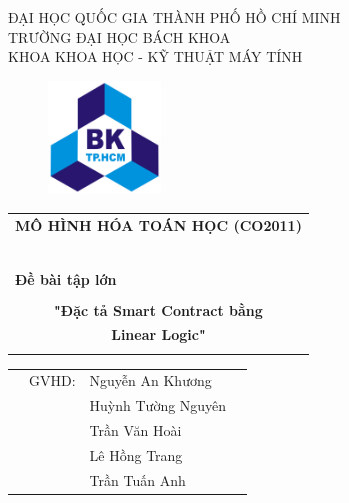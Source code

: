 \documentclass[a4paper]{article}
\begin{document}
\begin{titlepage}
\begin{center}
ĐẠI HỌC QUỐC GIA THÀNH PHỐ HỒ CHÍ MINH \\
TRƯỜNG ĐẠI HỌC BÁCH KHOA \\
KHOA KHOA HỌC - KỸ THUẬT MÁY TÍNH 
\end{center}

\vspace{1cm}

\begin{figure}[h!]
\begin{center}
\includegraphics[width=3cm]{Images/hcmut.png}
\end{center}
\end{figure}

\vspace{1cm}


\begin{center}
\begin{tabular}{c}
\multicolumn{1}{l}{\textbf{{\Large MÔ HÌNH HÓA TOÁN HỌC (CO2011)}}}\\
~~\\
\hline
\\
\multicolumn{1}{l}{\textbf{{\Large Đề bài tập lớn}}}\\
\\
\textbf{{\Huge "Đặc tả Smart Contract bằng}} \\
\textbf{{\Huge Linear Logic"}}\\
\\
\hline
\end{tabular}
\end{center}

\vspace{1.2cm}

\begin{table}[h]
\begin{tabular}{rrlr}
\hspace{5 cm} & GVHD: & Nguyễn An Khương &\\
\hspace{5 cm} &  & Huỳnh Tường Nguyên &\\
\hspace{5 cm} &  & Trần Văn Hoài &\\
\hspace{5 cm} &  & Lê Hồng Trang &\\
\hspace{5 cm} &  & Trần Tuấn Anh &\\



\end{tabular}
\end{table}
\end{titlepage}
\end{document}
